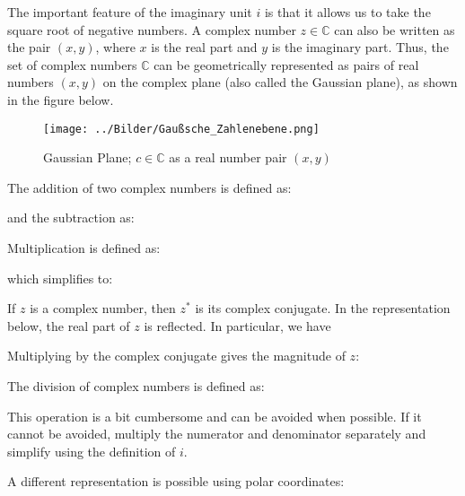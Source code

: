 The important feature of the imaginary unit \( i \) is that it allows us to take the square root of negative numbers. A complex number \( z \in \mathbb{C} \) can also be written as the pair \( (x, y) \), where \( x \) is the real part and \( y \) is the imaginary part. Thus, the set of complex numbers $\mathbb{C}$ can be geometrically represented as pairs of real numbers \( (x, y) \) on the complex plane (also called the Gaussian plane), as shown in the figure below.

\begin{figure}[ht]
    \centering
    \texttt{[image: ../Bilder/Gaußsche\_Zahlenebene.png]}
    \caption{Gaussian Plane; $c \in \mathbb{C}$ as a real number pair $(x, y)$}
    \label{fig:zahlplane}
\end{figure}

The addition of two complex numbers is defined as:


and the subtraction as:


Multiplication is defined as:


which simplifies to:


If \( z \) is a complex number, then \( z^* \) is its complex conjugate. In the representation below, the real part of \( z \) is reflected. In particular, we have 


Multiplying by the complex conjugate gives the magnitude of \( z \):


The division of complex numbers is defined as:


This operation is a bit cumbersome and can be avoided when possible. If it cannot be avoided, multiply the numerator and denominator separately and simplify using the definition of \( i \).

A different representation is possible using polar coordinates:

